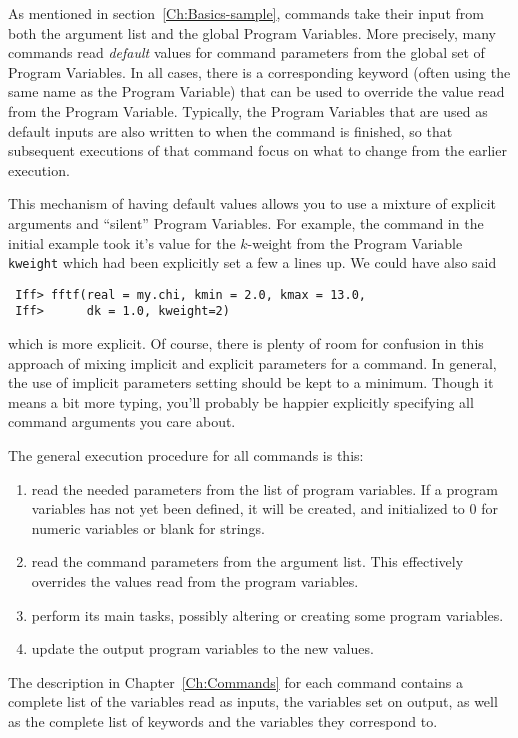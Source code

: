 As mentioned in section~\ref{Ch:Basics-sample}, commands take their input
from both the argument list and the global Program Variables. More
precisely, many commands read {\emph{default}} values for command
parameters from the global set of Program Variables.  In all cases, there
is a corresponding keyword (often using the same name as the Program
Variable) that can be used to override the value read from the Program
Variable.  Typically, the Program Variables that are used as default inputs
are also written to when the command is finished, so that subsequent
executions of that command focus on what to change from the earlier
execution.

This mechanism of having default values allows you to use a mixture of
explicit arguments and ``silent'' Program Variables.  For example, the
{} command in the initial example took it's value for the
$k$-weight from the Program Variable {\tt{kweight}} which had been
explicitly set a few a lines up.  We could have also said
\begin{verbatim}
 Iff> fftf(real = my.chi, kmin = 2.0, kmax = 13.0, 
 Iff>      dk = 1.0, kweight=2)
\end{verbatim}
\noindent
which is more explicit.  Of course, there is plenty of room for confusion
in this approach of mixing implicit and explicit parameters for a command.
In general, the use of implicit parameters setting should be kept to a
minimum.  Though it means a bit more typing, you'll probably be happier
explicitly specifying all command arguments you care about. 

The general execution procedure for all commands is this:
\begin{enumerate}
\item read the needed parameters from the list of program variables.  If a
  program variables has not yet been defined, it will be created, and
  initialized to 0 for numeric variables or blank for strings.
\item read the command parameters from the argument list.  This effectively
  overrides the values read from the program variables.
\item perform its main tasks, possibly altering or creating some program
  variables.
\item update the output program variables to the new values.
\end{enumerate}
\noindent
The description in Chapter~\ref{Ch:Commands} for each command contains a
complete list of the variables read as inputs, the variables set on output,
as well as the complete list of keywords and the variables they correspond
to.  

